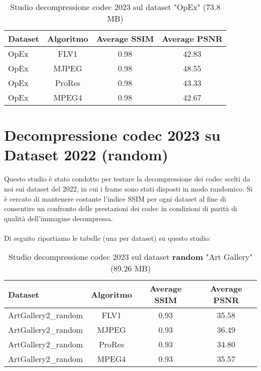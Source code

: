 \begin{table}[ht]
\centering
\begin{tabular}{|l|c|c|c|}
\hline
Dataset               & Algoritmo & Average SSIM & Average PSNR \\ \hline
OpEx                  & FLV1      & 0.98        & 42.83       \\ \hline
OpEx                  & MJPEG     & 0.98        & 48.55       \\ \hline
OpEx                  & ProRes    & 0.98        & 43.33       \\ \hline
OpEx                  & MPEG4     & 0.98        & 42.67       \\ \hline
\end{tabular}
\caption{Studio decompressione codec 2023 sul dataset "OpEx" (73.8 MB)}
\end{table}

\clearpage

\clearpage
\section{Decompressione codec 2023 su Dataset 2022 (random)}
Questo studio è stato condotto per testare la decompressione dei codec scelti da noi sui dataset del 2022, in cui i frame sono stati disposti in modo randomico. Si è cercato di mantenere costante l'indice SSIM per ogni dataset al fine di consentire un confronto delle prestazioni dei codec in condizioni di parità di qualità dell'immagine decompressa.
\\
\\
Di seguito riportiamo le tabelle (una per dataset) su questo studio:

\begin{table}[ht]
\centering
\begin{tabular}{|l|c|c|c|}
\hline
Dataset               & Algoritmo & Average SSIM & Average PSNR \\ \hline
ArtGallery2\_random   & FLV1      & 0.93        & 35.58       \\ \hline
ArtGallery2\_random   & MJPEG     & 0.93        & 36.49       \\ \hline
ArtGallery2\_random   & ProRes    & 0.93        & 34.80       \\ \hline
ArtGallery2\_random   & MPEG4     & 0.93        & 35.57       \\ \hline
\end{tabular}
\caption{Studio decompressione codec 2023 sul dataset \textbf{random} "Art Gallery" (89.26 MB)}
\end{table}

